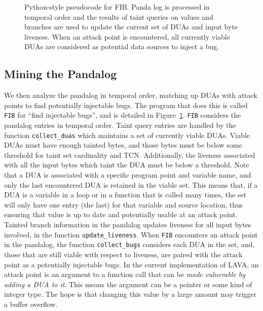 \begin{figure}

\caption{Python-style pseudocode for FIB. 
Panda log is processed in temporal order and the results of taint queries on values and branches are 
used to update the current set of DUAs and input byte liveness.
When an attack point is encountered, all currently viable DUAs are considered as potential data sources to inject a bug.}
\label{alg:fib}
\end{figure}

\subsection{Mining the Pandalog}
\label{sec:mining}
We then analyze the pandalog in temporal order, matching up DUAs with attack points to find potentially injectable bugs.
The program that does this is called \verb+FIB+ for ``find injectable bugs'', and is detailed in Figure~\ref{alg:fib}.
\verb+FIB+ considers the pandalog entries in temporal order.
Taint query entries are handled by the function \verb+collect_duas+ which maintains a set of currently viable DUAs.
Viable DUAs must have enough tainted bytes, and those bytes must be below some threshold for taint set cardinality and TCN.
Additionally, the liveness associated with all the input bytes which taint the DUA must be below a threshold.
Note that a DUA is associated with a specific program point and variable name, and only the last encountered DUA is retained in the viable set. 
This means that, if a DUA is a variable in a loop or in a function that is called many times, the set will only have one entry (the last) for that variable and source location, thus ensuring that value is up to date and potentially usable at an attack point.  
Tainted branch information in the pandalog updates liveness for all input bytes involved, in the function \verb+update_liveness+.
When \verb+FIB+ encounters an attack point in the pandalog, the function \verb+collect_bugs+ considers each DUA in the set,
and, those that are still viable with respect to liveness, are paired with the attack point as a potentially injectable bugs.
In the current implementation of LAVA, an attack point is an argument to a function call that can be \emph{made vulnerable by adding a DUA to it}.
This means the argument can be a pointer or some kind of integer type. 
The hope is that changing this value by a large amount may trigger a buffer overflow. 

